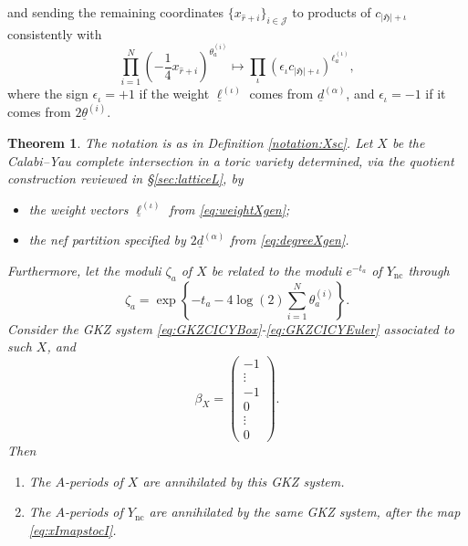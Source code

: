 \documentclass[12pt,a4paper,oneside]{amsart}
\numberwithin{equation}{section}
\newtheorem{thm}{Theorem}[section]
\theoremstyle{definition}
\theoremstyle{remark}
\newcommand{\Ync}{Y_{\mathrm{nc}}}
\begin{document}
and sending the remaining coordinates $\{ x_{\hat{r}+i}\}_{i \in \mathcal{J}}$ to products of $c_{\lvert \mathfrak{H}\rvert + \iota}$ consistently with 
\begin{equation}
\label{eq:xtocsign}
    \prod_{i=1}^{N} \left( - \frac{1}{4} x_{\hat{r}+i} \right)^{\theta_a^{(i)}} \mapsto \prod_{\iota} ( \epsilon_{\iota} c_{\lvert \mathfrak{H}\rvert + \iota } )^{\ell_a^{(\iota)}} ,
\end{equation}
where the sign $\epsilon_{\iota}=+1$ if the weight $\underline{\ell}^{(\iota)}$ comes from $ \underline{d}^{(\alpha)}$, and $\epsilon_{\iota}=-1$ if it comes from $2\underline{\theta}^{(i)}$.


\begin{thm}\label{thm:smoothX}
The notation is as in Definition \ref{notation:Xsc}. Let $X$ be the Calabi--Yau complete intersection in a toric variety determined, via the quotient construction reviewed in \S\ref{sec:latticeL}, by 
        \begin{itemize}
            \item the weight vectors $\underline{\ell}^{(\iota)}$ from \eqref{eq:weightXgen};
            \item the nef partition specified by $2\underline{d}^{(\alpha)}$ from \eqref{eq:degreeXgen}.
        \end{itemize}
Furthermore, let the moduli $\zeta_a$ of $X$ be related to the moduli $e^{-t_a}$ of $\Ync$ through 
\begin{equation*}
	\zeta_a= \exp \left\{ - t_a  - 4 \log (2) \sum_{i=1}^{N} \theta_a^{(i)} \right\} .
\end{equation*}
Consider the GKZ system \eqref{eq:GKZCICYBox}-\eqref{eq:GKZCICYEuler} associated to such $X$, and 
\begin{equation*}
\beta_X = \left( \begin{matrix} -1 \\ \vdots \\ -1 \\ 0 \\ \vdots \\ 0\end{matrix} \right).
\end{equation*}
Then
\begin{enumerate}[(1)]
    \item The $A$-periods of $X$ are annihilated by this GKZ system.
    \item The $A$-periods of $\Ync$ are annihilated by the same GKZ system, after the map \eqref{eq:xImapstocI}.
\end{enumerate}
\end{thm}
\end{document}
